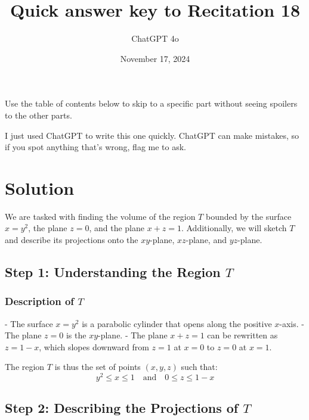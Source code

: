 \documentclass[11pt]{article}
\begin{document}
\title{Quick answer key to Recitation 18}
\author{ChatGPT 4o}
\date{November 17, 2024}
\maketitle

Use the table of contents below to skip to a specific part
without seeing spoilers to the other parts.

I just used ChatGPT to write this one quickly.
ChatGPT can make mistakes, so if you spot anything that's wrong, flag me to ask.

\tableofcontents


\newpage

\section{Solution}

We are tasked with finding the volume of the region \( T \) bounded by the surface \( x = y^2 \), the plane \( z = 0 \), and the plane \( x + z = 1 \). Additionally, we will sketch \( T \) and describe its projections onto the \( xy \)-plane, \( xz \)-plane, and \( yz \)-plane.

\newpage

\subsection{Step 1: Understanding the Region \( T \)}

\subsubsection{Description of \( T \)}

- The surface \( x = y^2 \) is a parabolic cylinder that opens along the positive \( x \)-axis.
- The plane \( z = 0 \) is the \( xy \)-plane.
- The plane \( x + z = 1 \) can be rewritten as \( z = 1 - x \), which slopes downward from \( z = 1 \) at \( x = 0 \) to \( z = 0 \) at \( x = 1 \).

The region \( T \) is thus the set of points \((x, y, z)\) such that:
\[
y^2 \leq x \leq 1 \quad \text{and} \quad 0 \leq z \leq 1 - x
\]

\newpage

\subsection{Step 2: Describing the Projections of \( T \)}
\end{document}

